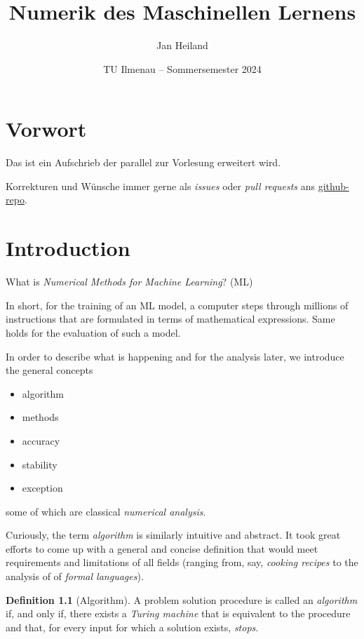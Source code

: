 \documentclass[
]{book}
\title{Numerik des Maschinellen Lernens}
\author{Jan Heiland}
\date{TU Ilmenau -- Sommersemester 2024}
\providecommand{\tightlist}{%
  \setlength{\itemsep}{0pt}\setlength{\parskip}{0pt}}
\theoremstyle{definition}
\newtheorem{definition}{Definition}[chapter]
\theoremstyle{definition}
\theoremstyle{definition}
\theoremstyle{definition}
\theoremstyle{remark}
\begin{document}
\maketitle

{
\hypersetup{linkcolor=}
\setcounter{tocdepth}{1}
\tableofcontents
}
\hypertarget{vorwort}{%
\chapter*{Vorwort}\label{vorwort}}

Das ist ein Aufschrieb der parallel zur Vorlesung erweitert wird.

Korrekturen und Wünsche immer gerne als \emph{issues} oder \emph{pull requests} ans \href{https://github.com/highlando/script-nmdl}{github-repo}.

\hypertarget{introduction}{%
\chapter{Introduction}\label{introduction}}

What is \emph{Numerical Methods for Machine Learning}? (ML)

In short, for the training of an ML model, a computer steps through millions of instructions that are formulated in terms of mathematical expressions.
Same holds for the evaluation of such a model.

In order to describe what is happening and for the analysis later, we introduce the general concepts

\begin{itemize}
\tightlist
\item
  algorithm
\item
  methods
\item
  accuracy
\item
  stability
\item
  exception
\end{itemize}

some of which are classical \emph{numerical analysis}.

Curiously, the term \emph{algorithm} is similarly intuitive and abstract. It took great efforts to come up with a general and concise definition that would meet requirements and limitations of all fields (ranging from, say, \emph{cooking recipes} to the analysis of of \emph{formal languages}).

\begin{definition}[Algorithm]
\protect\hypertarget{def:algorithm}{}\label{def:algorithm}A problem solution procedure is called an \emph{algorithm} if, and only if, there exists a \emph{Turing machine} that is equivalent to the procedure and that, for every input for which a solution exists, \emph{stops}.
\end{definition}
\end{document}
